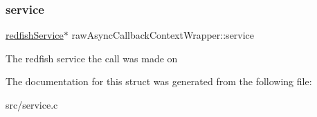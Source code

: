 \subsubsection{\texorpdfstring{service}{service}}
{\footnotesize\ttfamily \hyperlink{redfishService_8h_a4c9115c0f0a21de971c0dfae06f26372}{redfish\+Service}$\ast$ raw\+Async\+Callback\+Context\+Wrapper\+::service}

The redfish service the call was made on 

The documentation for this struct was generated from the following file\+:\begin{DoxyCompactItemize}
\item 
src/service.\+c\end{DoxyCompactItemize}

